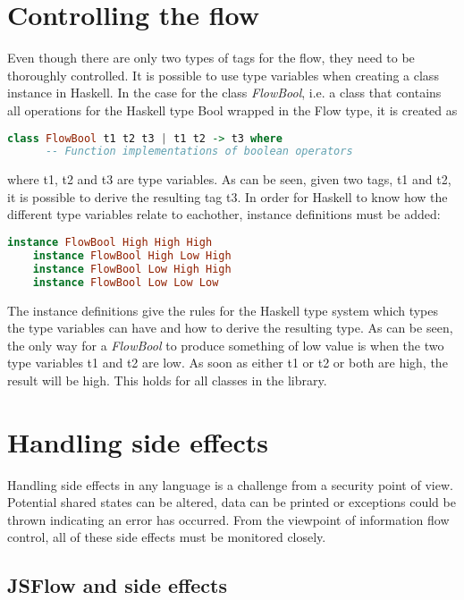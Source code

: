 \section{Controlling the flow}
Even though there are only two types of tags for the flow, they need to be thoroughly controlled. It is possible to use type variables when creating a class instance in Haskell. In the case for the class \emph{FlowBool}, i.e. a class that contains all operations for the Haskell type Bool wrapped in the Flow type, it is created as
\begin{center}
  \begin{lstlisting}[language=Haskell]
    class FlowBool t1 t2 t3 | t1 t2 -> t3 where
      -- Function implementations of boolean operators
  \end{lstlisting}
\end{center}
where t1, t2 and t3 are type variables. As can be seen, given two tags, t1 and t2, it is possible to derive the resulting tag t3. In order for Haskell to know how the different type variables relate to eachother, instance definitions must be added:
\begin{center}
  \begin{lstlisting}[language=Haskell]
    instance FlowBool High High High
    instance FlowBool High Low High
    instance FlowBool Low High High
    instance FlowBool Low Low Low
  \end{lstlisting}
\end{center}
The instance definitions give the rules for the Haskell type system which types the type variables can have and how to derive the resulting type. As can be seen, the only way for a \emph{FlowBool} to produce something of low value is when the two type variables t1 and t2 are low. As soon as either t1 or t2 or both are high, the result will be high. This holds for all classes in the library.

\section{Handling side effects}
Handling side effects in any language is a challenge from a security point of view. Potential shared states can be altered, data can be printed or exceptions could be thrown indicating an error has occurred. From the viewpoint of information flow control, all of these side effects must be monitored closely.

\subsection{JSFlow and side effects}

